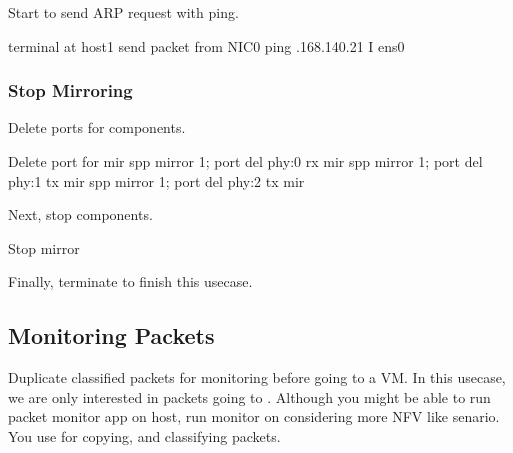 \documentclass[a4paper,11pt,openany,oneside,english]{sphinxmanual}
\begin{document}
Start to send ARP request with ping.

\begin{sphinxVerbatim}[commandchars=\\\{\},formatcom=\footnotesize]
 terminal  at host1
 send packet from NIC0
 ping .168.140.21 \PYGZhy{}I ens0
\end{sphinxVerbatim}


\subsubsection{Stop Mirroring}
\label{\detokenize{usecases/spp_mirror:stop-mirroring}}
Delete ports for components.

\begin{sphinxVerbatim}[commandchars=\\\{\},formatcom=\footnotesize]
\PYGZsh{} Delete port for mir
spp \PYGZgt{} mirror 1; port del phy:0 rx mir
spp \PYGZgt{} mirror 1; port del phy:1 tx mir
spp \PYGZgt{} mirror 1; port del phy:2 tx mir
\end{sphinxVerbatim}

Next, stop components.

\begin{sphinxVerbatim}[commandchars=\\\{\},formatcom=\footnotesize]
 Stop mirror

\end{sphinxVerbatim}

Finally, terminate  to finish this usecase.

\begin{sphinxVerbatim}[commandchars=\\\{\},formatcom=\footnotesize]
\end{sphinxVerbatim}


\subsection{Monitoring Packets}
\label{\detokenize{usecases/spp_mirror:monitoring-packets}}\label{\detokenize{usecases/spp_mirror:spp-usecases-mirror-monitor}}
Duplicate classified packets for monitoring before going to a VM.
In this usecase, we are only interested in packets going to .
Although you might be able to run packet monitor app on host,
run monitor on  considering more NFV like senario.
You use  for copying, and  classifying packets.
\end{document}
